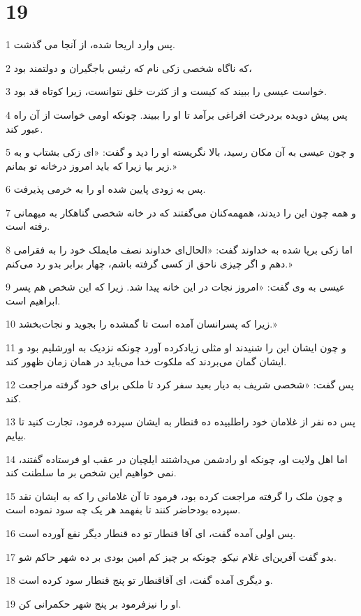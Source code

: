 \chapter{19}

\par 1 پس وارد اریحا شده، از آنجا می گذشت.
\par 2 که ناگاه شخصی زکی نام که رئیس باجگیران و دولتمند بود،
\par 3 خواست عیسی را ببیند که کیست و از کثرت خلق نتوانست، زیرا کوتاه قد بود.
\par 4 پس پیش دویده بردرخت افراغی برآمد تا او را ببیند. چونکه اومی خواست از آن راه عبور کند.
\par 5 و چون عیسی به آن مکان رسید، بالا نگریسته او را دید و گفت: «ای زکی بشتاب و به زیر بیا زیرا که باید امروز درخانه تو بمانم.»
\par 6 پس به زودی پایین شده او را به خرمی پذیرفت.
\par 7 و همه چون این را دیدند، همهمه‌کنان می‌گفتند که در خانه شخصی گناهکار به میهمانی رفته است.
\par 8 اما زکی برپا شده به خداوند گفت: «الحال‌ای خداوند نصف مایملک خود را به فقرامی دهم و اگر چیزی ناحق از کسی گرفته باشم، چهار برابر بدو رد می‌کنم.»
\par 9 عیسی به وی گفت: «امروز نجات در این خانه پیدا شد. زیرا که این شخص هم پسر ابراهیم است.
\par 10 زیرا که پسرانسان آمده است تا گمشده را بجوید و نجات‌بخشد.»
\par 11 و چون ایشان این را شنیدند او مثلی زیادکرده آورد چونکه نزدیک به اورشلیم بود و ایشان گمان می‌بردند که ملکوت خدا می‌باید در همان زمان ظهور کند.
\par 12 پس گفت: «شخصی شریف به دیار بعید سفر کرد تا ملکی برای خود گرفته مراجعت کند.
\par 13 پس ده نفر از غلامان خود راطلبیده ده قنطار به ایشان سپرده فرمود، تجارت کنید تا بیایم.
\par 14 اما اهل ولایت او، چونکه او رادشمن می‌داشتند ایلچیان در عقب او فرستاده گفتند، نمی خواهیم این شخص بر ما سلطنت کند.
\par 15 و چون ملک را گرفته مراجعت کرده بود، فرمود تا آن غلامانی را که به ایشان نقد سپرده بودحاضر کنند تا بفهمد هر یک چه سود نموده است.
\par 16 پس اولی آمده گفت، ای آقا قنطار تو ده قنطار دیگر نفع آورده است.
\par 17 بدو گفت آفرین‌ای غلام نیکو. چونکه بر چیز کم امین بودی بر ده شهر حاکم شو.
\par 18 و دیگری آمده گفت، ای آقاقنطار تو پنج قنطار سود کرده است.
\par 19 او را نیزفرمود بر پنج شهر حکمرانی کن.
